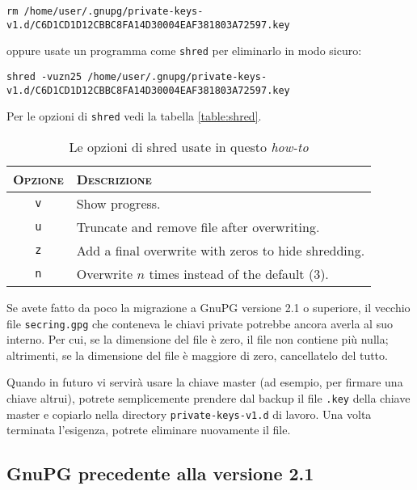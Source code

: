 \begin{lstlisting}
rm /home/user/.gnupg/private-keys-v1.d/C6D1CD1D12CBBC8FA14D30004EAF381803A72597.key
\end{lstlisting}

oppure usate un programma come \texttt{shred} per eliminarlo in modo
sicuro:

\begin{lstlisting}
shred -vuzn25 /home/user/.gnupg/private-keys-v1.d/C6D1CD1D12CBBC8FA14D30004EAF381803A72597.key
\end{lstlisting}

Per le opzioni di \texttt{shred} vedi la tabella \vref{table:shred}.

\begin{table}
    \centering
    \begin{tabularx}{.6\textwidth}{c l}
        \toprule
        \textsc{Opzione} & \textsc{Descrizione} \\
        \midrule
        \texttt{v} & Show progress. \\
        \texttt{u} & Truncate and remove file after overwriting. \\
        \texttt{z} & Add a final overwrite with zeros to hide shredding. \\
        \texttt{n} & Overwrite $n$ times instead of the default (3). \\
        \bottomrule
    \end{tabularx}
    \caption{Le opzioni di shred usate in questo \textit{how-to}}
    \label{table:shred}
\end{table}

Se avete fatto da poco la migrazione a GnuPG versione 2.1 o superiore, il
vecchio file \texttt{secring.gpg} che conteneva le chiavi private potrebbe
ancora averla al suo interno. Per cui, se la dimensione del file è zero, il file
non contiene più nulla; altrimenti, se la dimensione del file è maggiore di
zero, cancellatelo del tutto.

Quando in futuro vi servirà usare la chiave master (ad esempio, per firmare una
chiave altrui), potrete semplicemente prendere dal backup il file \texttt{.key}
della chiave master e copiarlo nella directory \texttt{private-keys-v1.d} di
lavoro. Una volta terminata l'esigenza, potrete eliminare nuovamente il file.

\subsection{GnuPG precedente alla versione 2.1}

